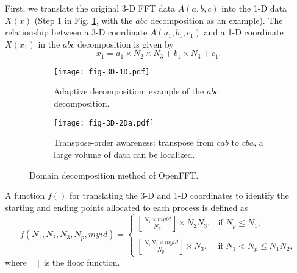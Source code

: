 First, we translate the original 3-D FFT data $A(a,b,c)$ into the 1-D data $X(x)$ (Step 1 in Fig. \ref{fig-3D-1D}, with the $abc$ decomposition as an example). 
The relationship between a 3-D coordinate $A(a_1,b_1,c_1)$ and a 1-D coordinate $X(x_1)$ in the $abc$ decomposition is given by
\begin{equation}
x_1=a_1 \times N_2 \times N_3 + b_1 \times N_3 + c_1.
\end{equation}


\begin{figure}
        \centering
        \begin{subfigure}{\textwidth}
                \texttt{[image: fig-3D-1D.pdf]}
                \caption{Adaptive decomposition: example of the $abc$ decomposition.}
                \label{fig-3D-1D}
        \end{subfigure}

        \begin{subfigure}{\textwidth}
                \texttt{[image: fig-3D-2Da.pdf]}
                \caption{Transpose-order awareness: transpose from $cab$ to $cba$, a large volume of data can be localized.}
                \label{fig-3D-2Da}
        \end{subfigure}
        \caption{Domain decomposition method of OpenFFT.}\label{fig-domain-openfft}
\end{figure}

\begin{comment}

\begin{figure}[htbp]
\begin{center}
\subfigure[Adaptive decomposition: example of the $abc$ decomposition.]{\label{fig-3D-1D}
\texttt{[image: fig-3D-1D.pdf]}}
\subfigure[Transpose-order awareness: transpose from $cab$ to $cba$, a large volume of data can be localized.]{\label{fig-3D-2Da}
\texttt{[image: fig-3D-2Da.pdf]}}
\end{center}
\caption{Domain decomposition method of OpenFFT.}
\label{fig-domain-openfft}
\end{figure}

\end{comment}


A function $f()$ for translating the 3-D and 1-D coordinates to identify the starting and ending points allocated to each process is defined as    
\begin{equation}
f(N_1,N_2,N_3,N_p,myid) = \begin{cases} \left \lfloor \frac{N_1 \times myid}{N_p} \right \rfloor \times N_2N_3, & \mbox{if } N_p \leq N_1 ;
\\ 
\\ \left \lfloor \frac{N_1N_2 \times myid}{N_p} \right \rfloor \times N_3 , & \mbox{if } N_1 < N_p \leq N_1N_2 ,
\end{cases}
\end{equation}
where $\left \lfloor  \right \rfloor$ is the floor function. 

